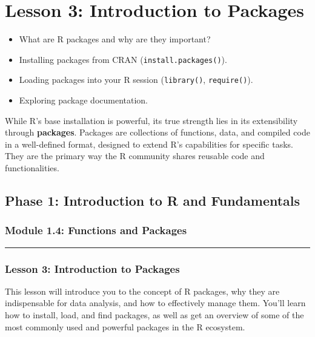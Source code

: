 \documentclass[
]{article}
\author{}
\date{\vspace{-2.5em}}
\providecommand{\tightlist}{%
  \setlength{\itemsep}{0pt}\setlength{\parskip}{0pt}}
\begin{document}
\section{Lesson 3: Introduction to
Packages}\label{lesson-3-introduction-to-packages}

\begin{itemize}
\tightlist
\item
  What are R packages and why are they important?
\item
  Installing packages from CRAN (\texttt{install.packages()}).
\item
  Loading packages into your R session (\texttt{library()},
  \texttt{require()}).
\item
  Exploring package documentation.
\end{itemize}

While R's base installation is powerful, its true strength lies in its
extensibility through \textbf{packages}. Packages are collections of
functions, data, and compiled code in a well-defined format, designed to
extend R's capabilities for specific tasks. They are the primary way the
R community shares reusable code and functionalities.

\subsection{\texorpdfstring{\textbf{Phase 1: Introduction to R and
Fundamentals}}{Phase 1: Introduction to R and Fundamentals}}\label{phase-1-introduction-to-r-and-fundamentals}

\subsubsection{\texorpdfstring{\textbf{Module 1.4: Functions and
Packages}}{Module 1.4: Functions and Packages}}\label{module-1.4-functions-and-packages}

\begin{center}\rule{0.5\linewidth}{0.5pt}\end{center}

\subsubsection{\texorpdfstring{\textbf{Lesson 3: Introduction to
Packages}}{Lesson 3: Introduction to Packages}}\label{lesson-3-introduction-to-packages-1}

This lesson will introduce you to the concept of R packages, why they
are indispensable for data analysis, and how to effectively manage them.
You'll learn how to install, load, and find packages, as well as get an
overview of some of the most commonly used and powerful packages in the
R ecosystem.
\end{document}
